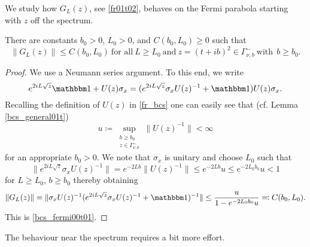 We study how $G_L(z)$, see \eqref{fr01t02}, behaves on the Fermi parabola starting with $z$ off the spectrum.

\begin{lemma}\label{bcs_fermi00t}
There are constants $b_0>0$, $L_0>0$, and $C(b_0,L_0)\geq 0$ such that
\begin{equation}\label{bcs_fermi00t01}
  \| G_L(z) \| \leq C(b_0,L_0)\ \text{for all} \ L\geq L_0 \ \text{and}\  z=(t+ib)^2\in\Gamma_{\nu,b}^- \ \text{with}\ \ b\geq b_0 .
\end{equation}
\end{lemma}
\begin{proof}
We use a Neumann series argument. To this end, we write
\begin{equation*}
  e^{2iL\sqrt{z}}\id + U(z)\sigma_x = ( e^{2iL\sqrt{z}} \sigma_x U(z)^{-1} + \id ) U(z)\sigma_x .
\end{equation*}
Recalling the definition of $U(z)$ in \eqref{fr_bcs} one can easily see that (cf. Lemma \ref{bcs_general01t})
\begin{equation*}
  u \coloneqq \sup_{\substack{b\geq b_0\\ z\in\Gamma_{\nu,b}^-}} \|U(z)^{-1}\|<\infty
\end{equation*}
for an appropriate $b_0>0$. We note that $\sigma_x$ is unitary and choose $L_0$ such that
\begin{equation*}
  \|e^{2iL\sqrt{z}} \sigma_x U(z)^{-1}\| = e^{-2Lb} \|U(z)^{-1}\| \leq e^{-2Lb} u \leq e^{-2L_0b_0} u < 1
\end{equation*}
for $L\geq L_0$, $b\geq b_0$ thereby obtaining
\begin{equation*}
  \|G_L(z)\| = \|\sigma_x U(z)^{-1}( e^{2iL\sqrt{z}} \sigma_x U(z)^{-1} + \id )^{-1}\| \leq \frac{u}{1- e^{-2L_0b_0} u} \eqqcolon C(b_0,L_0).
\end{equation*}
This is \eqref{bcs_fermi00t01}.
\end{proof}

The behaviour near the spectrum requires a bit more effort.

